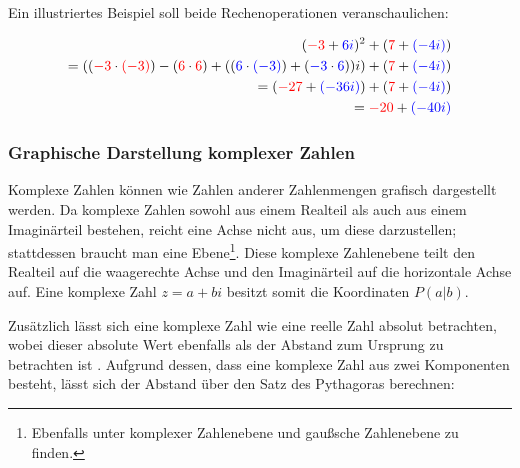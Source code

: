 Ein illustriertes Beispiel soll beide Rechenoperationen veranschaulichen:

\begin{equation}\label{eq:complex-numbers-example}
  \begin{split}
    (\begingroup\color{red} -3\endgroup + \begingroup\color{blue} 6i\endgroup)^2
      + (\begingroup\color{red} 7\endgroup + \begingroup\color{blue} (-4i)\endgroup) \\
    = (
        (\begingroup\color{red} -3\endgroup \cdot \begingroup\color{red} (-3)\endgroup)
          - (\begingroup\color{red} 6\endgroup \cdot \begingroup\color{red} 6\endgroup)
        + (
          (\begingroup\color{blue} 6\endgroup \cdot \begingroup\color{blue} (-3)\endgroup)
          + (\begingroup\color{blue} -3\endgroup \cdot \begingroup\color{blue} 6\endgroup)
        )i
      )
      + (\begingroup\color{red} 7\endgroup + \begingroup\color{blue} (-4i)\endgroup) \\
    = (\begingroup\color{red} -27\endgroup + \begingroup\color{blue} (-36i)\endgroup)
      + (\begingroup\color{red} 7\endgroup + \begingroup\color{blue} (-4i)\endgroup) \\
    = \begingroup\color{red} -20\endgroup + \begingroup\color{blue} (-40i)\endgroup
  \end{split}
\end{equation}

\subsubsection{Graphische Darstellung komplexer Zahlen}

Komplexe Zahlen können wie Zahlen anderer Zahlenmengen grafisch
dargestellt werden.
Da komplexe Zahlen sowohl aus einem Realteil als auch aus
einem Imaginärteil bestehen, reicht eine Achse nicht aus, um diese darzustellen;
stattdessen braucht man eine Ebene\footnote{
  Ebenfalls unter komplexer Zahlenebene und gaußsche Zahlenebene zu finden.
}.
Diese komplexe Zahlenebene teilt den Realteil auf die waagerechte Achse und
den Imaginärteil auf die horizontale Achse auf.
Eine komplexe Zahl $z = a + bi$ besitzt somit die Koordinaten $ P(a|b)$.

Zusätzlich lässt sich eine komplexe Zahl wie eine reelle Zahl absolut betrachten,
wobei dieser absolute Wert ebenfalls als der Abstand zum Ursprung zu betrachten ist
\cite[S. 3]{lichtenegger_komplexe_2002}.
Aufgrund dessen, dass eine komplexe Zahl aus zwei Komponenten besteht, lässt sich
der Abstand über den Satz des Pythagoras berechnen:

